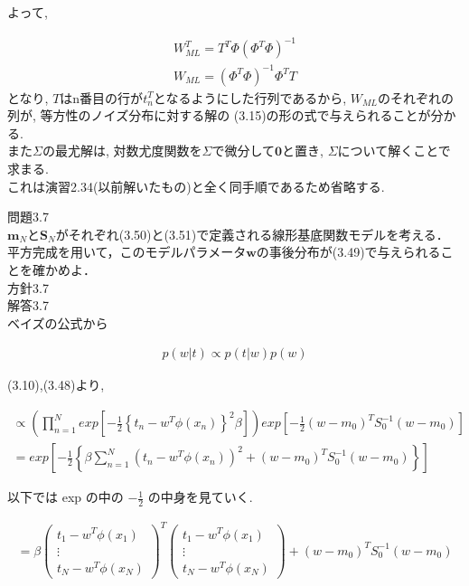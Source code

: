 \documentclass{jsarticle}
\begin{document}
よって, 

\begin{align*}
    W_{ML}^T = T^T\Phi (\Phi^T \Phi)^{-1} \\
    W_{ML} = (\Phi^T \Phi)^{-1}\Phi^T T
\end{align*}
となり, $T$はn番目の行が$t_n^T$となるようにした行列であるから, $W_{ML}$のそれぞれの列が, 等方性のノイズ分布に対する解の
(3.15)の形の式で与えられることが分かる. \\
また$\Sigma$の最尤解は, 対数尤度関数を$\Sigma$で微分して$\textbf{0}$と置き, $\Sigma$について解くことで求まる.　\\
これは演習2.34(以前解いたもの)と全く同手順であるため省略する.

\newpage

問題3.7 \\

$\boldsymbol{m}_N$と$\boldsymbol{S}_N$がそれぞれ(3.50)と(3.51)で定義される線形基底関数モデルを考える． 
平方完成を用いて，このモデルパラメータ$\boldsymbol{w}$の事後分布が(3.49)で与えられることを確かめよ．\\

方針3.7 \\

解答3.7 \\

ベイズの公式から

\begin{align*}
    p(w|t) \propto p(t|w)p(w)
\end{align*}

(3.10),(3.48)より,

\begin{align*}
    \propto \left( \prod_{n=1}^N exp\left[ -\frac{1}{2} \left\{ t_n - w^T \phi(x_n) \right\}^2 \beta \right] \right) exp\left[ -\frac{1}{2} (w - m_0)^TS_0^{-1}(w - m_0) \right] \\
    = exp\left[  -\frac{1}{2} \left\{ \beta \sum_{n=1}^N \left( t_n - w^T\phi(x_n) \right)^2 + (w - m_0)^TS_0^{-1}(w - m_0) \right\} \right]
\end{align*}

以下では exp の中の $-\frac{1}{2}$ の中身を見ていく.

\begin{align*}
    = \beta \left( \begin{array}{c}
        t_1 - w^T\phi(x_1) \\
        \vdots\\
        t_N - w^T\phi(x_N)
        \end{array} \right)^T
        \left( \begin{array}{c}
        t_1 - w^T\phi(x_1) \\
        \vdots\\
        t_N - w^T\phi(x_N)
        \end{array} \right)
        + (w - m_0)^TS_0^{-1}(w - m_0)
\end{align*}
\end{document}
